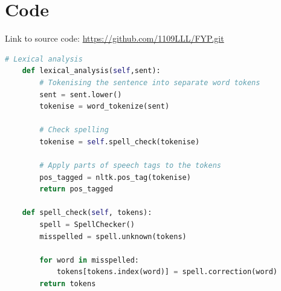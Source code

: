 \documentclass[a4paper]{report}
\begin{document}
{{\chapter{Code}
Link to source code: \url{https://github.com/1109LLL/FYP.git}

\begin{lstlisting}[language=Python,label={lst:lexical},caption={Lexical Analysis} ]
    # Lexical analysis
    def lexical_analysis(self,sent):
        # Tokenising the sentence into separate word tokens
        sent = sent.lower()
        tokenise = word_tokenize(sent)

        # Check spelling
        tokenise = self.spell_check(tokenise)

        # Apply parts of speech tags to the tokens
        pos_tagged = nltk.pos_tag(tokenise)
        return pos_tagged
    
    def spell_check(self, tokens):
        spell = SpellChecker()
        misspelled = spell.unknown(tokens)

        for word in misspelled:
            tokens[tokens.index(word)] = spell.correction(word)
        return tokens

\end{lstlisting}


}}
\end{document}
